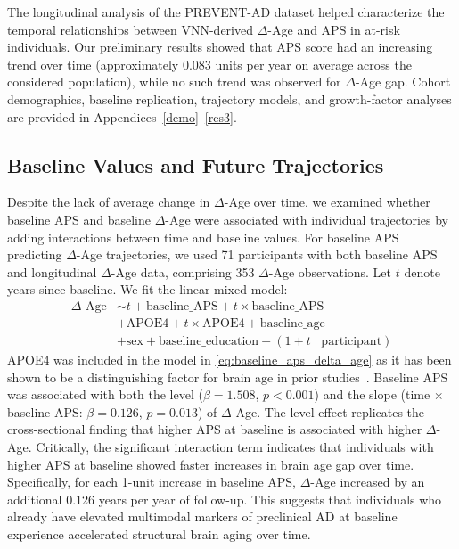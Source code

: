 \documentclass[conference]{IEEEtran}
\begin{document}
The longitudinal analysis of the PREVENT-AD dataset helped characterize the temporal relationships between VNN-derived $\Delta$-Age and APS in at-risk individuals. Our preliminary results showed that APS score had an increasing trend over time (approximately 0.083 units per year on average across the considered population), while no such trend was observed for $\Delta$-Age gap. Cohort demographics, baseline replication, trajectory models, and growth-factor analyses are provided in Appendices~\ref{demo}--\ref{res3}.

\subsection{Baseline Values and Future Trajectories}

Despite the lack of average change in $\Delta$-Age over time, we examined whether baseline APS and baseline $\Delta$-Age were associated with individual trajectories by adding interactions between time and baseline values. For baseline APS predicting $\Delta$-Age trajectories, we used 71 participants with both baseline APS and longitudinal $\Delta$-Age data, comprising 353 $\Delta$-Age observations. Let $t$ denote years since baseline. We fit the linear mixed model:
\begin{align}
\Delta\text{-Age} &\sim t + \text{baseline\_APS} + t \times \text{baseline\_APS} \nonumber\\
& + \text{APOE4} + t \times \text{APOE4} + \text{baseline\_age} \nonumber\\
& + \text{sex} + \text{baseline\_education} + (1 + t \mid \text{participant})
\label{eq:baseline_aps_delta_age}
\end{align}
APOE4 was included in the model in \eqref{eq:baseline_aps_delta_age} as it has been shown to be a distinguishing factor for brain age in prior studies~\cite{lowe2016effect,fouquet2014imaging}. Baseline APS was associated with both the level ($\beta = 1.508$, $p < 0.001$) and the slope (time $\times$ baseline APS: $\beta = 0.126$, $p = 0.013$) of $\Delta$-Age. The level effect replicates the cross-sectional finding that higher APS at baseline is associated with higher $\Delta$-Age. Critically, the significant interaction term indicates that individuals with higher APS at baseline showed faster increases in brain age gap over time. Specifically, for each 1-unit increase in baseline APS, $\Delta$-Age increased by an additional 0.126 years per year of follow-up. This suggests that individuals who already have elevated multimodal markers of preclinical AD at baseline experience accelerated structural brain aging over time.
\end{document}
